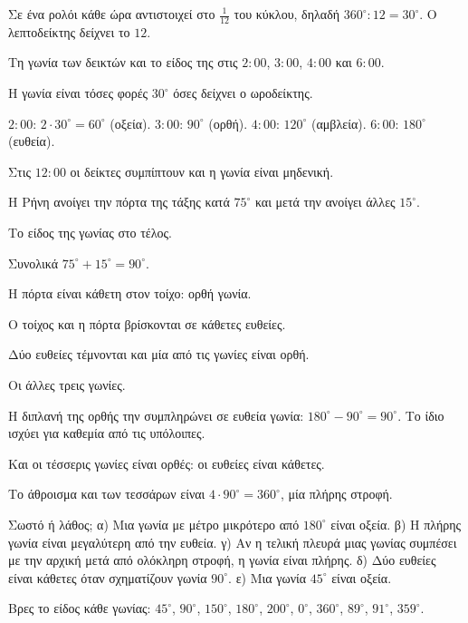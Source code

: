 \tixero Σε ένα ρολόι κάθε ώρα αντιστοιχεί στο $\frac{1}{12}$ του κύκλου, δηλαδή $360^\circ:12=30^\circ$. Ο λεπτοδείκτης δείχνει το $12$.\par
\tithelo Τη γωνία των δεικτών και το είδος της στις $2{:}00$, $3{:}00$, $4{:}00$ και $6{:}00$.\par
\possindeo Η γωνία είναι τόσες φορές $30^\circ$ όσες δείχνει ο ωροδείκτης.\par
\apantisi $2{:}00$: $2\cdot30^\circ=60^\circ$ (οξεία). $3{:}00$: $90^\circ$ (ορθή). $4{:}00$: $120^\circ$ (αμβλεία). $6{:}00$: $180^\circ$ (ευθεία).\par
\elegxos Στις $12{:}00$ οι δείκτες συμπίπτουν και η γωνία είναι μηδενική.

\tixero Η Ρήνη ανοίγει την πόρτα της τάξης κατά $75^\circ$ και μετά την ανοίγει άλλες $15^\circ$.\par
\tithelo Το είδος της γωνίας στο τέλος.\par
\possindeo Συνολικά $75^\circ+15^\circ=90^\circ$.\par
\apantisi Η πόρτα είναι κάθετη στον τοίχο: ορθή γωνία.\par
\elegxos Ο τοίχος και η πόρτα βρίσκονται σε κάθετες ευθείες.

\tixero Δύο ευθείες τέμνονται και μία από τις γωνίες είναι ορθή.\par
\tithelo Οι άλλες τρεις γωνίες.\par
\possindeo Η διπλανή της ορθής την συμπληρώνει σε ευθεία γωνία: $180^\circ-90^\circ=90^\circ$. Το ίδιο ισχύει για καθεμία από τις υπόλοιπες.\par
\apantisi Και οι τέσσερις γωνίες είναι ορθές: οι ευθείες είναι κάθετες.\par
\elegxos Το άθροισμα και των τεσσάρων είναι $4\cdot90^\circ=360^\circ$, μία πλήρης στροφή.



\ex Σωστό ή λάθος; α) Μια γωνία με μέτρο μικρότερο από $180^\circ$ είναι οξεία. \quad β) Η πλήρης γωνία είναι μεγαλύτερη από την ευθεία. \quad γ) Αν η τελική πλευρά μιας γωνίας συμπέσει με την αρχική μετά από ολόκληρη στροφή, η γωνία είναι πλήρης. \quad δ) Δύο ευθείες είναι κάθετες όταν σχηματίζουν γωνία $90^\circ$. \quad ε) Μια γωνία $45^\circ$ είναι οξεία.

\ex Βρες το είδος κάθε γωνίας: $45^\circ$, $90^\circ$, $150^\circ$, $180^\circ$, $200^\circ$, $0^\circ$, $360^\circ$, $89^\circ$, $91^\circ$, $359^\circ$.

